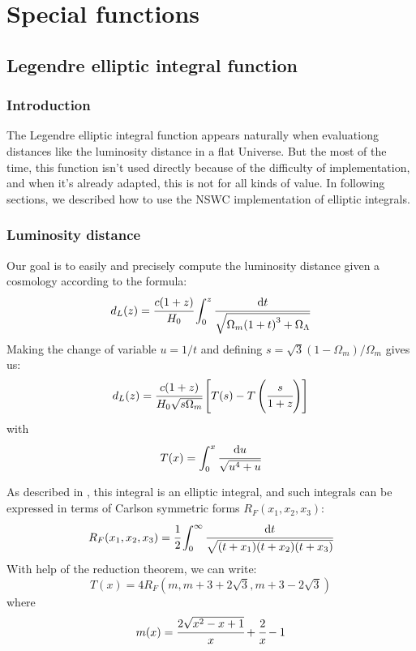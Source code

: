 \chapter{Special functions}
\label{cha:gamma}
%
\section{Legendre elliptic integral function}
%
\subsection{Introduction}
%
The Legendre elliptic integral function appears naturally when evaluationg
distances like the luminosity distance in a flat Universe. But the most of the
time, this function isn't used directly because of the difficulty of
implementation, and when it's already adapted, this is not for all kinds of
value. In following sections, we described how to use the NSWC implementation
of elliptic integrals.
%
\subsection{Luminosity distance}
%
Our goal is to easily and precisely compute the luminosity distance given a
cosmology according to the formula:
%
\begin{equation}
    d_L(z)=\cfrac{c(1+z)}{H_0}\int_0^z\cfrac{{\rm{d}}{t}}{\sqrt{\Omega_m{(1+t)}^3+\Omega_\Lambda}}
\end{equation}
%
Making the change of variable $u=1/t$ and defining
$s=\sqrt{3}{(1-\Omega_m)/\Omega_m}$ gives us:
%
\begin{equation}
    d_L(z)=\cfrac{c(1+z)}{H_0\sqrt{s\Omega_m}}\left[T(s)-T\left(\cfrac{s}{1+z}\right)\right]
\end{equation}
%
with
%
\begin{equation}
    T(x)=\int_0^x\cfrac{{\rm{d}}{u}}{\sqrt{u^4+u}}
\end{equation}

As described in \citet{Liu+11}, this integral is an elliptic integral, and such
integrals can be expressed in terms of Carlson symmetric forms
$R_F(x_1,x_2,x_3)$:
%
\begin{equation}
    R_F(x_1,x_2,x_3)=\cfrac{1}{2}\int_0^\infty\cfrac{{\rm{d}}{t}}{\sqrt{(t+x_1)(t+x_2)(t+x_3)}}
\end{equation}
%
With help of the reduction theorem, we can write: 
%
\begin{equation}
    T(x)=4R_F(m,m+3+2\sqrt{3},m+3-2\sqrt{3})
\end{equation}
%
where
%
\begin{equation}
    m(x)=\cfrac{2\sqrt{x^2-x+1}}{x}+\cfrac{2}{x}-1
\end{equation}
%
